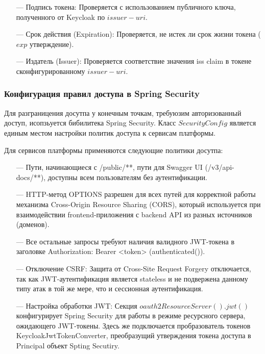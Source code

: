 \begin{itemize}
\item[---] Подпись токена: Проверяется с использованием публичного ключа, полученного от Keycloak по $issuer-uri$.
\item[---] Срок действия (Expiration): Проверяется, не истек ли срок жизни токена ($exp$ утверждение).
\item[---] Издатель (Issuer): Проверяется соответствие значения iss claim в токене сконфигурированному $issuer-uri$.
\end{itemize}

\subsubsection{Конфигурация правил доступа в Spring Security}

Для разграницения досутпа у конечным точкам, требуюзим авторизованный доступ, исопзьуется бибилитека Spring Security.
Класс $SecurityConfig$ является единым местом настройки политик доступа к сервисам платформы.

Для сервисов платформы применяются следующие политики досутпа:

\begin{itemize}
  \item[---]Пути, начинающиеся с /public/**, пути для Swagger UI (/v3/api-docs/**), доступны всем пользователям без аутентификации.
  \item[---]HTTP-метод OPTIONS разрешен для всех путей для корректной работы механизма Cross-Origin Resource Sharing (CORS)\cite{arai2024method}, который используется при взаимодействии frontend-приложения с backend API из разных источников (доменов).
  \item[---]Все остальные запросы требуют наличия валидного JWT-токена в заголовке Authorization: Bearer <token> (authenticated()).
  \item[---]Отключение CSRF\cite{barth2008robust}: Защита от Cross-Site Request Forgery отключается, так как JWT-аутентификация является stateless и не подвержена данному типу атак в той же мере, что и сессионная аутентификация.
  \item[---]Настройка обработки JWT: Секция $oauth2ResourceServer().jwt()$ конфигурирует Spring Security для работы в режиме ресурсного сервера, ожидающего JWT-токены. Здесь же подключается пробразователь токенов KeycloakJwtTokenConverter, преобразущий утверждения токена доступа в Principal объект Spting Secutiry.
\end{itemize}

